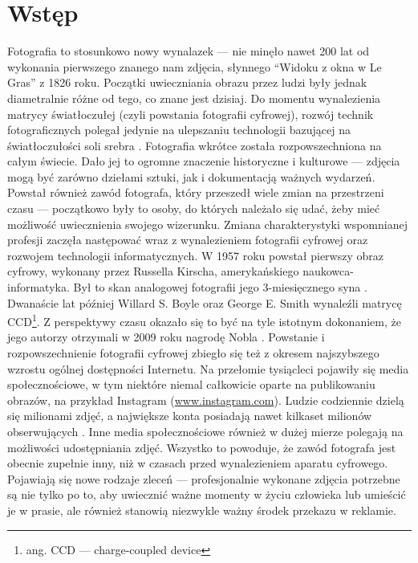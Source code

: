 \documentclass[12pt]{article}
\numberwithin{figure}{section}
\begin{document}
\begin{sloppypar}



\setcounter{page}{2}
\setcounter{secnumdepth}{3}


\tableofcontents
\pagebreak


\section{Wstęp}

Fotografia to stosunkowo nowy wynalazek --- nie minęło nawet 200 lat od wykonania pierwszego znanego nam zdjęcia, słynnego ``Widoku z okna w Le Gras'' z 1826 roku. Początki uwieczniania obrazu przez ludzi były jednak diametralnie różne od tego, co znane jest dzisiaj. Do momentu wynalezienia matrycy światłoczułej (czyli powstania fotografii cyfrowej), rozwój technik fotograficznych polegał jedynie na ulepszaniu technologii bazującej na światłoczułości soli srebra \cite{fotografia}. Fotografia wkrótce została rozpowszechniona na całym świecie. Dało jej to ogromne znaczenie historyczne i kulturowe --- zdjęcia mogą być zarówno dziełami sztuki, jak i dokumentacją ważnych wydarzeń. Powstał również zawód fotografa, który przeszedł wiele zmian na przestrzeni czasu --- początkowo były to osoby, do których należało się udać, żeby mieć możliwość uwiecznienia swojego wizerunku. Zmiana charakterystyki wspomnianej profesji zaczęła następować wraz z wynalezieniem fotografii cyfrowej oraz rozwojem technologii informatycznych. W 1957 roku powstał pierwszy obraz cyfrowy, wykonany przez Russella Kirscha, amerykańskiego naukowca-informatyka. Był to skan analogowej fotografii jego 3-miesięcznego syna \cite{firstdigitalphoto}. Dwanaście lat później Willard S. Boyle oraz George E. Smith wynaleźli matrycę CCD\footnote{ang. CCD --- charge-coupled device}. Z perspektywy czasu okazało się to być na tyle istotnym dokonaniem, że jego autorzy otrzymali w 2009 roku nagrodę Nobla \cite{nobelfoto}. Powstanie i rozpowszechnienie fotografii cyfrowej zbiegło się też z okresem najszybszego wzrostu ogólnej dostępności Internetu. Na przełomie tysiącleci pojawiły się media społecznościowe, w tym niektóre niemal całkowicie oparte na publikowaniu obrazów, na przykład Instagram (\url{www.instagram.com}). Ludzie codziennie dzielą się milionami zdjęć, a największe konta posiadają nawet kilkaset milionów obserwujących \cite{instagram}. Inne media społecznościowe również w dużej mierze polegają na możliwości udostępniania zdjęć. Wszystko to powoduje, że zawód fotografa jest obecnie zupełnie inny, niż w czasach przed wynalezieniem aparatu cyfrowego. Pojawiają się nowe rodzaje zleceń --- profesjonalnie wykonane zdjęcia potrzebne są nie tylko po to, aby uwiecznić ważne momenty w życiu człowieka lub umieścić je w prasie, ale również stanowią niezwykle ważny środek przekazu w reklamie. 


\end{sloppypar}
\end{document}
